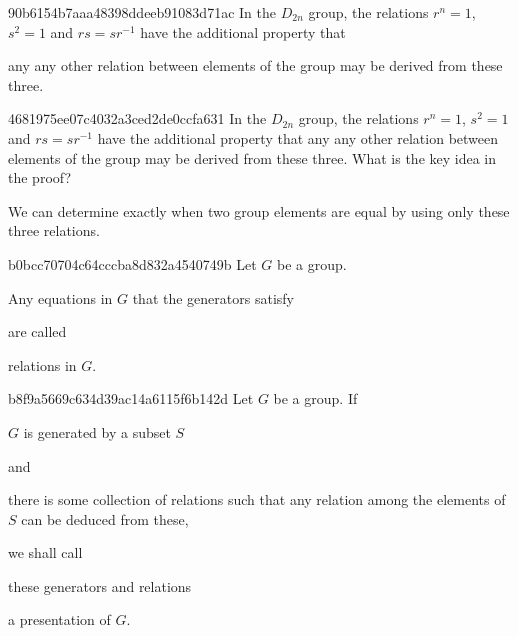 \begin{note}{90b6154b7aaa48398ddeeb91083d71ac}
    In the \({ D_{2n}  }\) group, the relations \({ r^{n} = 1 }\), \({ s^2 = 1 }\) and \({ rs = s r^{-1} }\) have the additional property that \begin{icloze}{1}any any other relation between elements of the group may be derived from these three.\end{icloze}
\end{note}

\begin{note}{4681975ee07c4032a3ced2de0ccfa631}
    In the \({ D_{2n}  }\) group, the relations \({ r^{n} = 1 }\), \({ s^2 = 1 }\) and \({ rs = s r^{-1} }\) have the additional property that any any other relation between elements of the group may be derived from these three.
    What is the key idea in the proof?

    \begin{cloze}{1}
        We can determine exactly when two group elements are equal by using only these three relations.
    \end{cloze}
\end{note}

\begin{note}{b0bcc70704c64cccba8d832a4540749b}
    Let \({ G }\) be a group. \begin{icloze}{1}Any equations in \({ G }\) that the generators satisfy\end{icloze} are called \begin{icloze}{2}relations in \({ G }\).\end{icloze}
\end{note}

\begin{note}{b8f9a5669c634d39ac14a6115f6b142d}
    Let \({ G }\) be a group. If \begin{icloze}{4}\({ G }\) is generated by a subset \({ S }\)\end{icloze} and \begin{icloze}{3}there is some collection of relations such that any relation among the elements of \({ S }\) can be deduced from these,\end{icloze} we shall call \begin{icloze}{2}these generators and relations\end{icloze} \begin{icloze}{1}a presentation of \({ G }\).\end{icloze}
\end{note}

